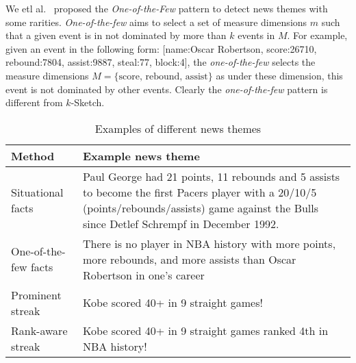 We etl al.~\cite{wu2012one} proposed the \emph{One-of-the-Few} pattern to detect news themes with some rarities. \emph{One-of-the-few} aims to select a set of measure dimensions $m$ such that a given event is in not dominated by more than $k$ events in $M$. For example, given an event in the following form: [name:Oscar Robertson, score:26710, rebound:7804, assist:9887, steal:77, block:4], the \emph{one-of-the-few} selects the measure dimensions $M=\{\text{score, rebound, assist}\}$ as under
these dimension, this event is not dominated by other events. Clearly the \emph{one-of-the-few} pattern is different from $k$-Sketch.

\begin{table}[h]
\centering
\begin{tabular}{|l|p{10cm}|}
\hline
\textbf{Method} & \textbf{Example news theme}\\
\hline
Situational facts~\cite{sultana2014incremental} & Paul George had 21 points, 11 rebounds and 5
assists to become the first Pacers player with a
20/10/5 (points/rebounds/assists) game against the
Bulls since Detlef Schrempf in December 1992.\\
\hline
One-of-the-few facts~\cite{wu2012one} & There is no player in NBA history with more points, more rebounds,
and more assists than Oscar Robertson in one's career\\
\hline
Prominent streak~\cite{zhang2014discovering} & Kobe scored 40+ in 9 straight games!  \\
\hline
Rank-aware streak & Kobe scored 40+ in 9 straight games ranked 4th in NBA history! \\
\hline
\end{tabular}
\caption{Examples of different news themes}
\label{tbl:ksketch:related_works}
\end{table}


